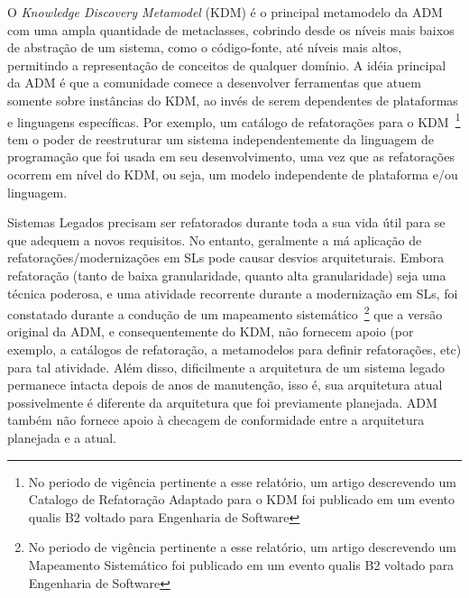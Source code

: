 O \textit{Knowledge Discovery Metamodel} (KDM) é o principal metamodelo da ADM com uma ampla quantidade de metaclasses, cobrindo desde os níveis mais baixos de abstração de um sistema, como o código-fonte, até níveis mais altos, permitindo a representação de conceitos de qualquer domínio. A idéia principal da ADM é que a comunidade comece a desenvolver ferramentas que atuem somente sobre instâncias do KDM, ao invés de serem dependentes de plataformas e linguagens específicas. Por exemplo, um catálogo de refatorações para o KDM~\citep{iri_catalogue_of_refactoring_2014}\footnote{No periodo de vigência pertinente a esse relatório, um artigo descrevendo um Catalogo de Refatoração Adaptado para o KDM foi publicado em um evento qualis B2 voltado para Engenharia de Software} tem o poder de reestruturar um sistema independentemente da linguagem de programação que foi usada em seu desenvolvimento, uma vez que as refatorações ocorrem em nível do KDM, ou seja, um modelo independente de plataforma e/ou linguagem. 

Sistemas Legados precisam ser refatorados durante toda a sua vida útil para se que adequem a novos requisitos. No entanto, geralmente a má aplicação de refatorações/modernizações em SLs pode causar desvios arquiteturais. Embora refatoração (tanto de baixa granularidade, quanto alta granularidade) seja uma técnica poderosa, e uma atividade recorrente durante a modernização  em SLs, foi constatado durante a condução de um mapeamento sistemático~\citep{iri_systematic_mapping_ADM_2014}\footnote{No periodo de vigência pertinente a esse relatório, um artigo descrevendo um Mapeamento Sistemático foi publicado em um evento qualis B2 voltado para Engenharia de Software} 
que a versão original da ADM, e consequentemente do KDM, não fornecem apoio (por exemplo, a catálogos de refatoração, a metamodelos para definir refatorações, etc) para tal atividade. Além disso, dificilmente a arquitetura de um sistema legado permanece intacta depois de anos de manutenção, isso é, sua arquitetura atual possivelmente é diferente da arquitetura que foi previamente planejada. ADM também não fornece apoio à checagem de conformidade entre a arquitetura planejada e a atual.

